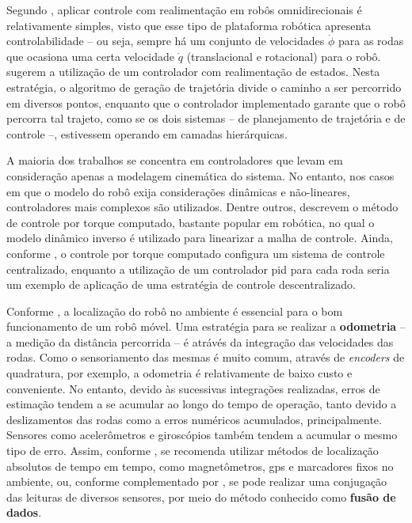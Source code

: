 Segundo \citet{lynch2017modern}, aplicar controle com realimentação em robôs omnidirecionais é relativamente simples, visto que esse tipo de plataforma robótica apresenta controlabilidade -- ou seja, sempre há um conjunto de velocidades \textbf{$\dot\phi$} para as rodas que ocasiona uma certa velocidade \textbf{$\dot{q}$} (translacional e rotacional) para o robô. \citet{siegwart2011introduction} sugerem a utilização de um controlador com realimentação de estados. Nesta estratégia, o algoritmo de geração de trajetória divide o caminho a ser percorrido em diversos pontos, enquanto que o controlador implementado garante que o robô percorra tal trajeto, como se os dois sistemas -- de planejamento de trajetória e de controle --, estivessem operando em camadas hierárquicas.

A maioria dos trabalhos se concentra em controladores que levam em consideração apenas a modelagem cinemática do sistema. No entanto, nos casos em que o modelo do robô exija considerações dinâmicas e não-lineares, controladores mais complexos são utilizados. Dentre outros, \citet{siciliano2016springer} descrevem o método de controle por torque computado, bastante popular em robótica, no qual o modelo dinâmico inverso é utilizado para linearizar a malha de controle. Ainda, conforme \citet{indiveri2009swedish}, o controle por torque computado configura um sistema de controle centralizado, enquanto a utilização de um controlador \acrshort{pid} para cada roda seria um exemplo de aplicação de uma estratégia de controle descentralizado.

Conforme \citet{lynch2017modern}, a localização do robô no ambiente é essencial para o bom funcionamento de um robô móvel. Uma estratégia para se realizar a \textbf{odometria} -- a medição da distância percorrida -- é atrávés da integração das velocidades das rodas. Como o sensoriamento das mesmas é muito comum, através de \textit{encoders} de quadratura, por exemplo, a odometria é relativamente de baixo custo e conveniente. No entanto, devido às sucessivas integrações realizadas, erros de estimação tendem a se acumular ao longo do tempo de operação, tanto devido a deslizamentos das rodas como a erros numéricos acumulados, principalmente. Sensores como acelerômetros e giroscópios também tendem a acumular o mesmo tipo de erro. Assim, conforme \citet{siegwart2011introduction}, se recomenda utilizar métodos de localização absolutos de tempo em tempo, como magnetômetros, \acrshort{gps} e marcadores fixos no ambiente, ou, conforme complementado por \citet{lynch2017modern}, se pode realizar uma conjugação das leituras de diversos sensores, por meio do método conhecido como \textbf{fusão de dados}.

